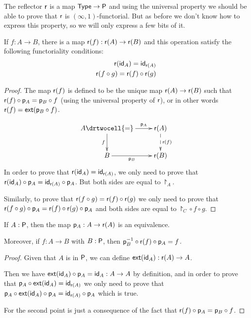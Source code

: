 
The reflector $\reflect$ is a map $\type\to\P$ and using the universal property
we should be able to prove that $\reflect$ is $(\infty,1)$-functorial. But as
before we don’t know how to express this property, so we will only express a few
bits of it.

\begin{defn}
  If $f:A\to{}B$, there is a map $\reflect(f):\reflect(A)\to\reflect(B)$ and
  this operation satisfy the following functoriality conditions:
  \begin{align*}
    \reflect(\idfunc[A])=\idfunc[\reflect(A)]\\
    \reflect(f\circ{}g)=\reflect(f)\circ\reflect(g)
  \end{align*}
\end{defn}

\begin{proof}
  The map $\reflect(f)$ is defined to be the unique map
  $\reflect(A)\to\reflect(B)$ such that
  $\reflect(f)\circ\project_A=\project_B\circ{}f$ (using the universal property
  of $\reflect$), or in other words $\reflect(f)=\ext(\project_B\circ{}f)$.

  \[\uppercurveobject{{ }}\lowercurveobject{{ }}\twocellhead{{ }}
  \xymatrix{A \ar^-{\project_A}[r] \ar_-f[d] \drtwocell{=} & \reflect(A)
    \ar@{-->}^-{\reflect(f)}[d]
    \\ B \ar_-{\project_B}[r] & \reflect(B)}\]
  In order to prove that $\reflect(\idfunc[A])=\idfunc[\reflect(A)]$, we only
  need to prove that
  $\reflect(\idfunc[A])\circ\project_A=\idfunc[\reflect(A)]\circ\project_A$. But
  both sides are equal to $\project_A$.

  Similarly, to prove that $\reflect(f\circ{}g)=\reflect(f)\circ\reflect(g)$ we
  only need to prove that $\reflect(f\circ{}g)\circ\project_A=
  \reflect(f)\circ\reflect(g)\circ\project_A$ and both sides are equal to
  $\project_C\circ{}f\circ{}g$.
\end{proof}

\begin{lem}
  \label{reflectPequiv}
  If $A:\P$, then the map $\project_A:A\to\reflect(A)$ is an equivalence.

  Moreover, if $f:A\to{}B$ with $B:\P$, then
  $\project_B^{-1}\circ\reflect(f)\circ\project_A = f$.
\end{lem}
\begin{proof}
  Given that $A$ is in $\P$, we can define $\ext(\idfunc[A]):\reflect(A)\to{}A$.

  Then we have $\ext(\idfunc[A])\circ\project_A=\idfunc[A]:A\to{}A$ by
  definition, and in order to prove that
  $\project_A\circ\ext(\idfunc[A])=\idfunc[\reflect(A)]$ we only need to prove
  that $\project_A\circ\ext(\idfunc[A])\circ\project_A=
  \idfunc[\reflect(A)]\circ\project_A$ which is true.

  For the second point is just a consequence of the fact that
  $\reflect(f)\circ\project_A=\project_B\circ{}f$.
\end{proof}

